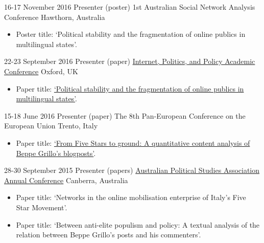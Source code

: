 \documentclass[12pt,a4paper,sans]{moderncv}
\begin{document}
    \cventry
      {16-17 November 2016} %
    {Presenter (poster)} %
    {1st Australian Social Network Analysis Conference} %
    {Hawthorn, Australia} %
  {}
    {
      \begin{itemize} %
        \item {Poster title: `Political stability and the fragmentation of online publics in multilingual states'.}
      \end{itemize}
    }

    \cventry
        {22-23 September 2016} %
    {Presenter (paper)} %
    {\href{http://ipp.oii.ox.ac.uk/2016}{Internet, Politics, and Policy Academic Conference}} %
    {Oxford, UK} %
{}
    {
      \begin{itemize} %
        \item {Paper title: \href{http://ipp.oii.ox.ac.uk/2016/programme-2016/track-a-politics/participation-ii-networks-and/francesco-bailo-political-stability-and}{`Political stability and the fragmentation of online publics in multilingual states'}.}
      \end{itemize}
    }


    \cventry
        {15-18 June 2016} %
    {Presenter (paper)} %
    {The 8th Pan-European Conference on the European Union} %
    {Trento, Italy} %
{}
    {
      \begin{itemize} %
        \item {Paper title:  \href{http://ecpr.eu/Events/PaperDetails.aspx?PaperID=27234&amp;EventID=105}{`From Five Stars to ground: A quantitative content analysis of Beppe Grillo's blogposts'}.}
      \end{itemize}
    }

    \cventry
        {28-30 September 2015} %
    {Presenter (papers)} %
    {\href{http://www.auspsa.org.au/page/apsa-conference-2015-0}{Australian Political Studies Association Annual Conference}} %
    {Canberra, Australia} %
{}
    {
      \begin{itemize} %
        \item {Paper title: `Networks in the online mobilisation enterprise of Italy's Five Star Movement'.}
        \item {Paper title: `Between anti-elite populism and policy: A textual analysis of the relation between Beppe Grillo's posts and his commenters'.}
      \end{itemize}
    }
\end{document}

